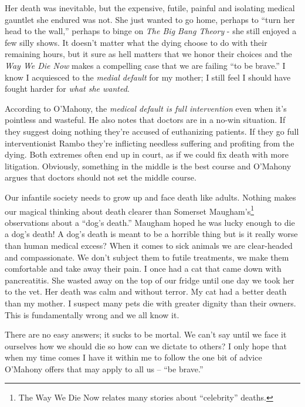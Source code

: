 Her death was inevitable, but the expensive, futile, painful and
isolating medical gauntlet she endured was not. She just wanted to go
home, perhaps to ``turn her head to the wall,'' perhaps to binge on
\emph{The Big Bang Theory} - she still enjoyed a few silly shows. It
doesn't matter what the dying choose to do with their remaining hours,
but it sure as hell matters that we honor their choices and the
\emph{Way We Die Now} makes a compelling case that we are failing ``to
be brave.'' I know I acquiesced to the \emph{medial default} for my
mother; I still feel I should have fought harder for \emph{what she
wanted}.

According to O'Mahony, the \emph{medical default is full intervention}
even when it's pointless and wasteful. He also notes that doctors are in
a no-win situation. If they suggest doing nothing they're accused of
euthanizing patients. If they go full interventionist Rambo they're
inflicting needless suffering and profiting from the dying. Both
extremes often end up in court, as if we could fix death with more
litigation. Obviously, something in the middle is the best course and
O'Mahony argues that doctors should not set the middle course.

Our infantile society needs to grow up and face death like adults.
Nothing makes our magical thinking about death clearer than Somerset
Maugham's\footnote{The Way We Die Now relates many 
stories about ``celebrity'' deaths.}
observations about
a ``dog's death.'' Maugham hoped he was lucky enough to die a dog's
death! A dog's death is meant to be a horrible thing but is it really
worse than human medical excess? When it comes to sick animals we are
clear-headed and compassionate. We don't subject them to futile
treatments, we make them comfortable and take away their pain. I once
had a cat that came down with pancreatitis. She wasted away on the top
of our fridge until one day we took her to the vet. Her death was calm
and without terror. My cat had a better death than my mother. I suspect
many pets die with greater dignity than their owners. This is
fundamentally wrong and we all know it.

There are no easy answers; it sucks to be mortal. We can't say until we
face it ourselves how we should die so how can we dictate to others? I
only hope that when my time comes I have it within me to follow the one
bit of advice O'Mahony offers that may apply to all us -- ``be brave.''


%
%


%

